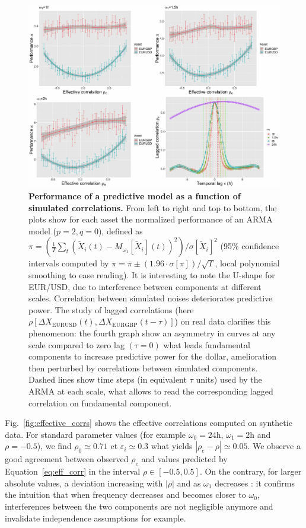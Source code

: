 \documentclass{article}
\begin{document}
\begin{figure}%
\includegraphics[width=\linewidth]{Fig5.jpg}
\caption{\textbf{Performance of a predictive model as a function of simulated correlations.} From left to right and top to bottom, the plots show for each asset the normalized performance of an ARMA model ($p=2,q=0$), defined as $\pi = \left(\frac{1}{T}\sum_t\left(\tilde{X}_i(t) - M_{\omega_1}\left[\tilde{X}_i\right](t)\right)^2 \right) / \sigma \left[ \tilde{X}_i \right]^2$ (95\% confidence intervals computed by $\pi = \bar{\pi} \pm (1.96\cdot \sigma [\pi])/\sqrt{T}$, local polynomial smoothing to ease reading). It is interesting to note the U-shape for EUR/USD, due to interference between components at different scales. Correlation between simulated noises deteriorates predictive power. The study of lagged correlations (here $\rho [\Delta X_{\textrm{EURUSD}}(t),\Delta X_{\textrm{EURGBP}}(t-\tau)]$) on real data clarifies this phenomenon: the fourth graph show an asymmetry in curves at any scale compared to zero lag $(\tau = 0)$ what leads fundamental components to increase predictive power for the dollar, amelioration then perturbed by correlations between simulated components. Dashed lines show time steps (in equivalent $\tau$ units) used by the ARMA at each scale, what allows to read the corresponding lagged correlation on fundamental component.\label{fig:model_perf}}
\end{figure}




Fig.~\ref{fig:effective_corrs} shows the effective correlations computed on synthetic data. For standard parameter values (for example $\omega_0=24\textrm{h}$, $\omega_1=2\textrm{h}$ and $\rho=-0.5$), we find $\rho_0\simeq 0.71$ et $\varepsilon_i \simeq 0.3$ what yields $\left| \rho_e - \rho \right|\simeq 0.05$. We observe a good agreement between observed $\rho_e$ and values predicted by Equation~\ref{eq:eff_corr} in the interval $\rho \in [-0.5,0.5]$. On the contrary, for larger absolute values, a deviation increasing with $\left|\rho\right|$ and as $\omega_1$ decreases : it confirms the intuition that when frequency decreases and becomes closer to $\omega_0$, interferences between the two components are not negligible anymore and invalidate independence assumptions for example.
\end{document}
